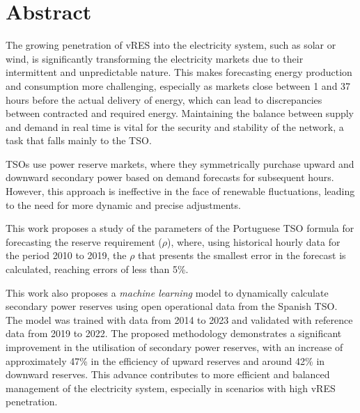 \chapter{Abstract}
\justifying

The growing penetration of \gls{vRES} into the electricity system, such as solar or wind, is significantly transforming the electricity markets due to their intermittent and unpredictable nature. This makes forecasting energy production and consumption more challenging, especially as markets close between 1 and 37 hours before the actual delivery of energy, which can lead to discrepancies between contracted and required energy. Maintaining the balance between supply and demand in real time is vital for the security and stability of the network, a task that falls mainly to the \gls{TSO}.\par
\gls{TSO}s use power reserve markets, where they symmetrically purchase upward and downward secondary power based on demand forecasts for subsequent hours. However, this approach is ineffective in the face of renewable fluctuations, leading to the need for more dynamic and precise adjustments.\par
This work proposes a study of the parameters of the Portuguese \gls{TSO} formula for forecasting the reserve requirement ($\rho$), where, using historical hourly data for the period 2010 to 2019, the $\rho$ that presents the smallest error in the forecast is calculated, reaching errors of less than 5\%.\par
This work also proposes a \textit{machine learning} model to dynamically calculate secondary power reserves using open operational data from the Spanish \gls{TSO}. The model was trained with data from 2014 to 2023 and validated with reference data from 2019 to 2022. The proposed methodology demonstrates a significant improvement in the utilisation of secondary power reserves, with an increase of approximately 47\% in the efficiency of upward reserves and around 42\% in downward reserves. This advance contributes to more efficient and balanced management of the electricity system, especially in scenarios with high \gls{vRES} penetration.



\vspace{0.5cm} %

